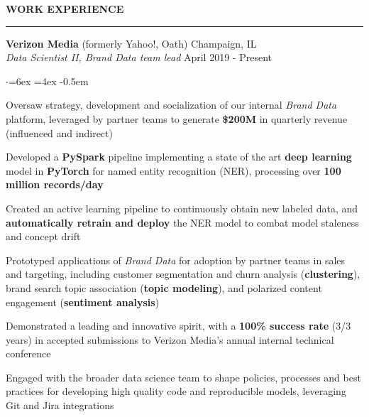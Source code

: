 \documentclass[11pt]{article}
\newenvironment{rSection}[1]{ %
  \sectionskip
  \MakeUppercase{\textbf{#1}} %
  \sectionlineskip
  \hrule %
  \begin{list}{}{ %
    \setlength{\leftmargin}{1.5em} %
  }
  \item[]
}{
  \end{list}
}
\def\sectionlineskip{\smallskip} %
\def\sectionskip{\smallskip} %
\begin{document}
\begin{rSection}{Work Experience}
{\bfseries Verizon Media} (formerly Yahoo!, Oath) \hfill Champaign, IL \\
{\em \hspace*{2ex} Data Scientist II, Brand Data team lead} \hfill April 2019 - Present

\begin{list}{$\cdot$}{\leftmargin=6ex \rightmargin=4ex} %
   \itemsep -0.5em \vspace{-0.5em} %
   \item Oversaw strategy, development and socialization of our internal \textit{Brand Data} platform, leveraged by partner teams to generate \textbf{\$200M} in quarterly revenue (influenced and indirect)
   \item Developed a \textbf{PySpark} pipeline implementing a state of the art \textbf{deep learning} model in \textbf{PyTorch} for named entity recognition (NER), processing over \textbf{100 million records/day}
   \item Created an active learning pipeline to continuously obtain new labeled data, and \textbf{automatically retrain and deploy} the NER model to combat model staleness and concept drift
   \item Prototyped applications of \textit{Brand Data} for adoption by partner teams in sales and targeting, including customer segmentation and churn analysis (\textbf{clustering}), brand search topic association (\textbf{topic modeling}), and polarized content engagement (\textbf{sentiment analysis})
   \item Demonstrated a leading and innovative spirit, with a \textbf{100\% success rate} (3/3 years) in accepted submissions to Verizon Media's annual internal technical conference
   \item Engaged with the broader data science team to shape policies, processes and best practices for developing high quality code and reproducible models, leveraging Git and Jira integrations
\end{list}


\end{rSection}
\end{document}

